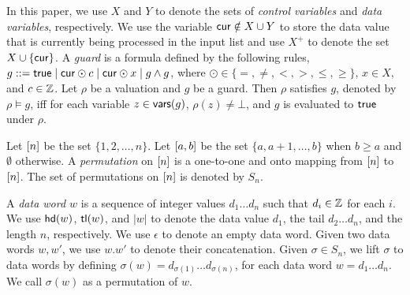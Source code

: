 In this paper, we use $X$ and $Y$ to denote the sets of \emph{control variables} and \emph{data variables}, respectively. We use the variable $\mathsf{cur} \notin X\cup Y$ to store the data value that is currently being processed in the input list and use $X^+$ to denote the set $X\cup \{\mathsf{cur}\}$.
A \emph{guard} is a formula defined by the following rules, $g::= \mathsf{true} \mid \mathsf{cur}\odot c \mid \mathsf{cur}\odot x \mid g \wedge g$, where $\odot \in \{=,\neq,<, >, \le, \ge\}$, $x \in X$, and $c\in {\mathbb{Z} }$. 
Let $\rho$ be a valuation and $g$ be a guard. Then $\rho$ satisfies $g$, denoted by $\rho \models g$, iff for each variable $z \in \mathsf{vars}(g)$, $\rho(z) \neq \bot$, and $g$ is evaluated to $\mathsf{true}$ under $\rho$. 

Let $[n]$ be the set $\{ 1, 2, \ldots, n \}$. Let $[a,b]$ be the set $\{ a, a+1, \ldots, b \}$ when $b\geq a$ and $\emptyset$ otherwise. A \emph{permutation} on
$[n]$ is a one-to-one and onto mapping from $[n]$ to
$[n]$. The set of
permutations on $[n]$ is denoted by $S_n$.

A \emph{data word $w$} is a sequence of integer values $d_1\ldots d_n$ such that $d_i \in {\mathbb{Z} }$ for each $i$.
We use $\mathsf{hd}(w)$, $\mathsf{tl}(w)$, and $|w|$ to denote the data value $d_1$, the tail $d_2\dots d_n$, and the length $n$, respectively.
We use $\epsilon$ to denote an empty data word.
Given two data words $w,w'$, we use $w.w'$ to denote their concatenation.
Given $\sigma \in S_n$, we lift $\sigma$ to data words by defining $\sigma(w)=d_{\sigma(1)} \ldots d_{\sigma(n)}$, for each data word $w=d_1\ldots d_n$. We call $\sigma(w)$ as a permutation of $w$.